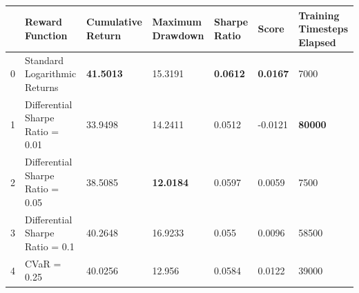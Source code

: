 \begin{tabular}{lllllll}
\toprule
 & Reward Function & Cumulative Return & Maximum Drawdown & Sharpe Ratio & Score & Training Timesteps Elapsed \\
\midrule
0 & Standard Logarithmic Returns & \textbf{41.5013} & 15.3191 & \textbf{0.0612} & \textbf{0.0167} & 7000 \\
1 & Differential Sharpe Ratio = 0.01 & 33.9498 & 14.2411 & 0.0512 & -0.0121 & \textbf{80000} \\
2 & Differential Sharpe Ratio = 0.05 & 38.5085 & \textbf{12.0184} & 0.0597 & 0.0059 & 7500 \\
3 & Differential Sharpe Ratio = 0.1 & 40.2648 & 16.9233 & 0.055 & 0.0096 & 58500 \\
4 & CVaR = 0.25 & 40.0256 & 12.956 & 0.0584 & 0.0122 & 39000 \\
\bottomrule
\end{tabular}
